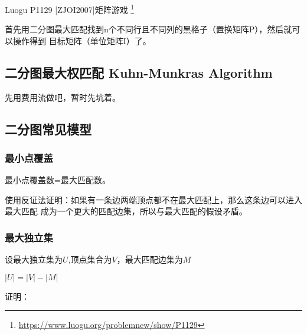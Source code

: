 Luogu P1129 [ZJOI2007]矩阵游戏
\footnote{\url{https://www.luogu.org/problemnew/show/P1129}}

首先用二分图最大匹配找到n个不同行且不同列的黑格子（置换矩阵P），然后就可以操作得到
目标矩阵（单位矩阵I）了。



\subsection{二分图最大权匹配 Kuhn-Munkras Algorithm}
先用费用流做吧，暂时先坑着。
\subsection{二分图常见模型}

\subsubsection{最小点覆盖}

\begin{theorem}
	最小点覆盖数=最大匹配数。
\end{theorem}

使用反证法证明：如果有一条边两端顶点都不在最大匹配上，那么这条边可以进入最大匹配
成为一个更大的匹配边集，所以与最大匹配的假设矛盾。

\subsubsection{最大独立集}

设最大独立集为$U$,顶点集合为$V$，最大匹配边集为$M$

\begin{theorem}
	$|U|=|V|-|M|$
\end{theorem}

证明：

